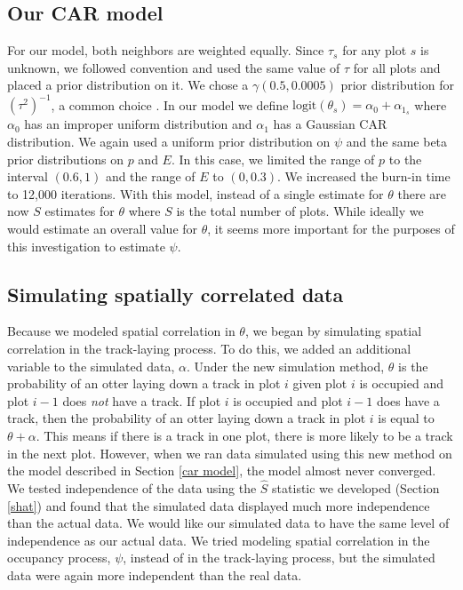 \documentclass[12pt]{article}
\begin{document}
    \subsection{Our CAR model}
    \label{car model}
    For our model, both neighbors are weighted equally. Since $\tau_s$ for any
    plot $s$ is unknown, we followed convention and used the same value of
    $\tau$ for all plots and placed a prior distribution on it. We chose a
    $\gamma(0.5,0.0005)$ prior distribution for $(\tau^2)^{-1}$, a common choice
    \cite{Thomas2004}. In our model we define $\text{logit}(\theta_s)=\alpha_0+
    \alpha_{1_s}$ where $\alpha_0$ has an improper uniform distribution and
    $\alpha_1$ has a Gaussian CAR distribution. We again used a uniform prior
    distribution on $\psi$ and the same beta prior distributions on $p$ and $E$.
    In this case, we limited the range of $p$ to the interval $(0.6,1)$ and the
    range of $E$ to $(0,0.3)$. We increased the burn-in time to 12,000
    iterations. With this model, instead of a single estimate for $\theta$ there
    are now $S$ estimates for $\theta$ where $S$ is the total number of plots.
    While ideally we would estimate an overall value for $\theta$, it seems more
    important for the purposes of this investigation to estimate $\psi$.

    \subsection{Simulating spatially correlated data}
    \label{spatial simulation}
    Because we modeled spatial correlation in $\theta$, we began by simulating
    spatial correlation in the track-laying process. To do this, we added an
    additional variable to the simulated data, $\alpha$. Under the new
    simulation method, $\theta$ is the probability of an otter laying down a
    track in plot $i$ given plot $i$ is occupied and plot $i-1$ does
    \textit{not} have a track. If plot $i$ is occupied and plot $i-1$ does have
    a track, then the probability of an otter laying down a track in plot $i$ is
    equal to $\theta+\alpha$. This means if there is a track in one plot, there
    is more likely to be a track in the next plot. However, when we ran data
    simulated using this new method on the model described in Section \ref{car
    model}, the model almost never converged. We tested independence of the data
    using the $\hat{S}$ statistic we developed (Section \ref{shat}) and found
    that the simulated data displayed much more independence than the actual
    data. We would like our simulated data to have the same level of
    independence
    as our actual data.  We tried modeling spatial correlation in the occupancy
    process, $\psi$, instead of in the track-laying process, but the simulated
    data were again more independent than the real data.
\end{document}
